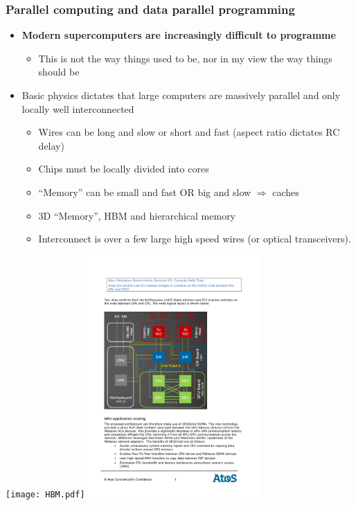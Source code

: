 \documentclass[pdf,ps,8pt]{beamer}
\begin{document}
\begin{frame}[fragile]\small\frametitle{ Parallel computing and data parallel programming}
  \begin{itemize}
  \item {\bf Modern supercomputers are increasingly difficult to programme}
  \begin{itemize}
  \item This is not the way things used to be, nor in my view the way things should be
  \end{itemize}
  \item Basic physics dictates that large computers are massively parallel and only locally well interconnected
  \begin{itemize}
  \item Wires can be long and slow or short and fast (aspect ratio dictates RC delay)
  \item Chips must be locally divided into cores
  \item ``Memory'' can be small and fast OR big and slow $\Rightarrow$ caches
  \item 3D ``Memory'', HBM and hierarchical memory
  \item Interconnect is over a few large high speed wires (or optical transceivers).
  \end{itemize}
  \end{itemize}
  \begin{center}
    \texttt{[image: HBM.pdf]}
    \includegraphics[width=0.49\textwidth]{TursaNode.pdf}
    \end{center}
\end{frame}
\end{document}
